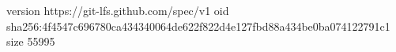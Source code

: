 version https://git-lfs.github.com/spec/v1
oid sha256:4f4547c696780ca434340064de622f822d4e127fbd88a434be0ba074122791c1
size 55995

